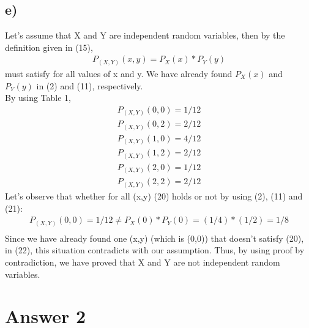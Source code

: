 \documentclass[12pt]{article}
\begin{document}
\subsection*{e)} Let's assume that X and Y are independent random variables, then by the definition given in (15),
\begin{equation} 
\begin{split}
P_{(X,Y)}(x,y) = P_{X}(x)*P_{Y}(y)
\end{split}
\end{equation}
must satisfy for all values of x and y. 
We have already found $P_{X}(x)$ and $P_{Y}(y)$ in (2) and (11), respectively. \\
By using Table 1, 
\begin{equation} 
\begin{split}
P_{(X,Y)}(0,0) = 1/12\\
P_{(X,Y)}(0,2) = 2/12\\
P_{(X,Y)}(1,0) = 4/12\\
P_{(X,Y)}(1,2) = 2/12\\
P_{(X,Y)}(2,0) = 1/12\\
P_{(X,Y)}(2,2) = 2/12
\end{split}
\end{equation}
Let’s observe that whether for all (x,y) (20) holds or not by using (2), (11) and (21):
\begin{equation} 
\begin{split}
P_{(X,Y)}(0,0) = 1/12 \neq P_{X}(0)*P_{Y}(0) = (1/4)*(1/2) = 1/8\\
\end{split}
\end{equation}
Since we have already found one (x,y) (which is (0,0)) that doesn't satisfy (20), in (22), this situation contradicts with our assumption. Thus, by using proof by contradiction, we have proved that X and Y are not independent random variables.

\section*{Answer 2}
\end{document}
